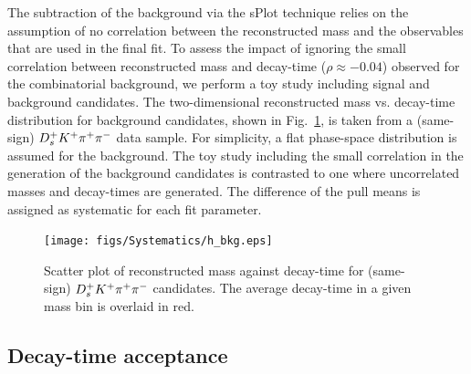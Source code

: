 The subtraction of the background via the sPlot technique relies on the assumption of no correlation between the reconstructed mass and the observables 
that are used in the final fit. 
To assess the impact of ignoring the small correlation between reconstructed mass and decay-time ($\rho \approx -0.04$) observed for the combinatorial background, 
we perform a toy study including signal and background candidates.
The two-dimensional reconstructed mass vs. decay-time distribution for background candidates, shown in Fig.~\ref{fig:bkg2D}, 
is taken from a (same-sign) $D_s^+ K^+ {{\pi}^+}{{\pi}^-}$ data sample.
For simplicity, a flat phase-space distribution is assumed for the background.
The toy study including the small correlation in the generation of the background candidates 
is contrasted to one where uncorrelated masses and decay-times are generated.
The difference of the pull means is assigned as systematic for each fit parameter.

\begin{figure}[h]
\centering
\texttt{[image: figs/Systematics/h\_bkg.eps]}
\caption{\small Scatter plot of reconstructed mass against decay-time for (same-sign) $D_s^+ K^+ {{\pi}^+}{{\pi}^-}$ candidates.
The average decay-time in a given mass bin is overlaid in red.}
\label{fig:bkg2D}
\end{figure}

\subsection{Decay-time acceptance}
\label{subsec:SystTime}
\enlargethispage{2\baselineskip}


